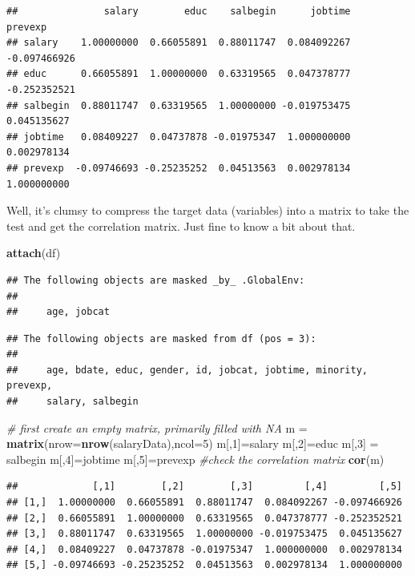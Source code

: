 \documentclass[
]{ctexart}
\newenvironment{Shaded}{\begin{snugshade}}{\end{snugshade}}
\newcommand{\AttributeTok}[1]{\textcolor[rgb]{0.13,0.29,0.53}{#1}}
\newcommand{\CommentTok}[1]{\textcolor[rgb]{0.56,0.35,0.01}{\textit{#1}}}
\newcommand{\DecValTok}[1]{\textcolor[rgb]{0.00,0.00,0.81}{#1}}
\newcommand{\FunctionTok}[1]{\textcolor[rgb]{0.13,0.29,0.53}{\textbf{#1}}}
\newcommand{\NormalTok}[1]{#1}
\newcommand{\OtherTok}[1]{\textcolor[rgb]{0.56,0.35,0.01}{#1}}
\begin{document}
\begin{verbatim}
##               salary        educ    salbegin      jobtime      prevexp
## salary    1.00000000  0.66055891  0.88011747  0.084092267 -0.097466926
## educ      0.66055891  1.00000000  0.63319565  0.047378777 -0.252352521
## salbegin  0.88011747  0.63319565  1.00000000 -0.019753475  0.045135627
## jobtime   0.08409227  0.04737878 -0.01975347  1.000000000  0.002978134
## prevexp  -0.09746693 -0.25235252  0.04513563  0.002978134  1.000000000
\end{verbatim}

Well, it's clumsy to compress the target data (variables) into a matrix
to take the test and get the correlation matrix. Just fine to know a bit
about that.

\begin{Shaded}
\begin{Highlighting}[]
\FunctionTok{attach}\NormalTok{(df)}
\end{Highlighting}
\end{Shaded}

\begin{verbatim}
## The following objects are masked _by_ .GlobalEnv:
## 
##     age, jobcat
\end{verbatim}

\begin{verbatim}
## The following objects are masked from df (pos = 3):
## 
##     age, bdate, educ, gender, id, jobcat, jobtime, minority, prevexp,
##     salary, salbegin
\end{verbatim}

\begin{Shaded}
\begin{Highlighting}[]
\CommentTok{\# first create an empty matrix, primarily filled with NA}
\NormalTok{m }\OtherTok{=} \FunctionTok{matrix}\NormalTok{(}\AttributeTok{nrow=}\FunctionTok{nrow}\NormalTok{(salaryData),}\AttributeTok{ncol=}\DecValTok{5}\NormalTok{)}
\NormalTok{m[,}\DecValTok{1}\NormalTok{]}\OtherTok{=}\NormalTok{salary}
\NormalTok{m[,}\DecValTok{2}\NormalTok{]}\OtherTok{=}\NormalTok{educ}
\NormalTok{m[,}\DecValTok{3}\NormalTok{] }\OtherTok{=}\NormalTok{ salbegin}
\NormalTok{m[,}\DecValTok{4}\NormalTok{]}\OtherTok{=}\NormalTok{jobtime  }
\NormalTok{m[,}\DecValTok{5}\NormalTok{]}\OtherTok{=}\NormalTok{prevexp}
\CommentTok{\#check the correlation matrix}
\FunctionTok{cor}\NormalTok{(m)}
\end{Highlighting}
\end{Shaded}

\begin{verbatim}
##             [,1]        [,2]        [,3]         [,4]         [,5]
## [1,]  1.00000000  0.66055891  0.88011747  0.084092267 -0.097466926
## [2,]  0.66055891  1.00000000  0.63319565  0.047378777 -0.252352521
## [3,]  0.88011747  0.63319565  1.00000000 -0.019753475  0.045135627
## [4,]  0.08409227  0.04737878 -0.01975347  1.000000000  0.002978134
## [5,] -0.09746693 -0.25235252  0.04513563  0.002978134  1.000000000
\end{verbatim}
\end{document}
